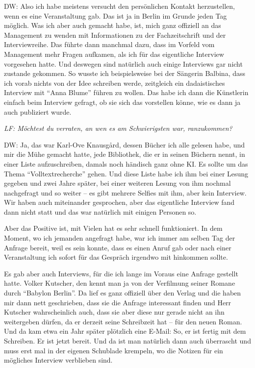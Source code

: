\documentclass[a4paper,
fontsize=11pt,
oneside,
numbers=noperiodatend,
parskip=half-,
bibliography=totoc,
final
]{scrartcl}
\begin{document}
DW: Also ich habe meistens versucht den persönlichen Kontakt
herzustellen, wenn es eine Veranstaltung gab. Das ist ja in Berlin im
Grunde jeden Tag möglich. Was ich aber auch gemacht habe, ist, mich ganz
offiziell an das Management zu wenden mit Informationen zu der
Fachzeitschrift und der Interviewreihe. Das führte dann manchmal dazu,
dass im Vorfeld vom Management mehr Fragen aufkamen, als ich für das
eigentliche Interview vorgesehen hatte. Und deswegen sind natürlich auch
einige Interviews gar nicht zustande gekommen. So wusste ich
beispielsweise bei der Sängerin Balbina, dass ich vorab nichts von der
Idee schreiben werde, zeitgleich ein dadaistisches Interview mit
\enquote{Anna Blume} führen zu wollen. Das habe ich dann die Künstlerin
einfach beim Interview gefragt, ob sie sich das vorstellen könne, wie es
dann ja auch publiziert wurde.

\emph{LF: Möchtest du verraten, an wen es am Schwierigsten war,
ranzukommen?}

DW: Ja, das war Karl-Ove Knausgård, dessen Bücher ich alle gelesen habe,
und mir die Mühe gemacht hatte, jede Bibliothek, die er in seinen
Büchern nennt, in einer Liste aufzuschreiben, damals noch händisch ganz
ohne KI. Es sollte um das Thema \enquote{Volltextrecherche} gehen. Und
diese Liste habe ich ihm bei einer Lesung gegeben und zwei Jahre später,
bei einer weiteren Lesung von ihm nochmal nachgefragt und so weiter --
es gibt mehrere Selfies mit ihm, aber kein Interview. Wir haben auch
miteinander gesprochen, aber das eigentliche Interview fand dann nicht
statt und das war natürlich mit einigen Personen so.

Aber das Positive ist, mit Vielen hat es sehr schnell funktioniert. In
dem Moment, wo ich jemanden angefragt habe, war ich immer am selben Tag
der Anfrage bereit, weil es sein konnte, dass es einen Anruf gab oder
nach einer Veranstaltung ich sofort für das Gespräch irgendwo mit hinkommen
sollte.

Es gab aber auch Interviews, für die ich lange im Voraus eine Anfrage
gestellt hatte. Volker Kutscher, den kennt man ja von der Verfilmung
seiner Romane durch \enquote{Babylon Berlin}. Da lief es ganz offiziell
über den Verlag und die haben mir dann nett geschrieben, dass sie die
Anfrage interessant finden und Herr Kutscher wahrscheinlich auch, dass
sie aber diese nur gerade nicht an ihn weitergeben dürfen, da er derzeit
seine Schreibzeit hat -- für den neuen Roman. Und da kam etwa ein Jahr
später plötzlich eine E-Mail: So, er ist fertig mit dem Schreiben. Er
ist jetzt bereit. Und da ist man natürlich dann auch überrascht und muss
erst mal in der eigenen Schublade krempeln, wo die Notizen für ein
mögliches Interview verblieben sind.
\end{document}
